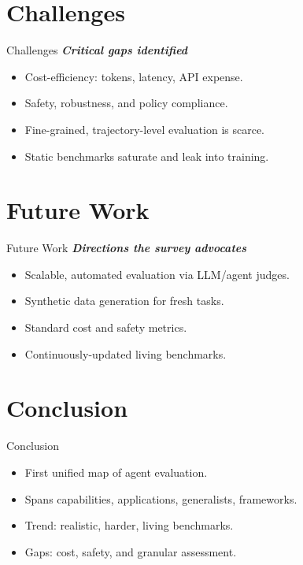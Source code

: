 \documentclass{beamer}
\begin{document}
\section{Challenges}
\begin{frame}{Challenges}
\textbf{\textit{Critical gaps identified}}
\begin{itemize}
\item Cost-efficiency: tokens, latency, API expense.
\item Safety, robustness, and policy compliance.
\item Fine-grained, trajectory-level evaluation is scarce.
\item Static benchmarks saturate and leak into training.
\end{itemize}
\end{frame}

\section{Future Work}
\begin{frame}{Future Work}
\textbf{\textit{Directions the survey advocates}}
\begin{itemize}
\item Scalable, automated evaluation via LLM/agent judges.
\item Synthetic data generation for fresh tasks.
\item Standard cost and safety metrics.
\item Continuously-updated living benchmarks.
\end{itemize}
\end{frame}

\section{Conclusion}
\begin{frame}{Conclusion}
\begin{itemize}
\item First unified map of agent evaluation.
\item Spans capabilities, applications, generalists, frameworks.
\item Trend: realistic, harder, living benchmarks.
\item Gaps: cost, safety, and granular assessment.
\end{itemize}
\end{frame}
\end{document}
